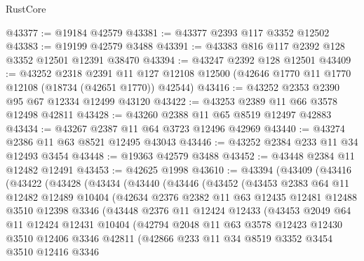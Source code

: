 \begin{lexlean}{RustCore}
\begin{coremodule}
@43377 := @19184 @42579
@43381 := @43377 @2393 @117 @3352 @12502
@43383 := @19199 @42579 @3488
@43391 := @43383 @816 @117 @2392 @128 @3352 @12501 @12391 @38470
@43394 := @43247 @2392 @128 @12501
@43409 := @43252
    @2318
    @2391
    @11
    @127
    @12108
    @12500
    (@42646 @1770 @11 @1770 @12108 (@18734 (@42651 @1770)) @42544)
@43416 := @43252 @2353 @2390 @95 @67 @12334 @12499 @43120
@43422 := @43253 @2389 @11 @66 @3578 @12498 @42811
@43428 := @43260 @2388 @11 @65 @8519 @12497 @42883
@43434 := @43267 @2387 @11 @64 @3723 @12496 @42969
@43440 := @43274 @2386 @11 @63 @8521 @12495 @43043
@43446 := @43252 @2384 @233 @11 @34 @12493 @3454
@43448 := @19363 @42579 @3488
@43452 := @43448 @2384 @11 @12482 @12491
@43453 := @42625 @1998
@43610 := @43394
    (@43409
      (@43416
        (@43422
          (@43428
            (@43434
              (@43440
                (@43446
                  (@43452
                    (@43453
                      @2383
                      @64
                      @11
                      @12482
                      @12489
                      @10404
                      (@42634
                        @2376
                        @2382
                        @11
                        @63
                        @12435
                        @12481
                        @12488
                        @3510
                        @12398
                        @3346
                        (@43448
                          @2376
                          @11
                          @12424
                          @12433
                          (@43453
                            @2049
                            @64
                            @11
                            @12424
                            @12431
                            @10404
                            (@42794
                              @2048
                              @11
                              @63
                              @3578
                              @12423
                              @12430
                              @3510
                              @12406
                              @3346
                              @42811
                              (@42866
                                @233
                                @11
                                @34
                                @8519
                                @3352
                                @3454
                                @3510
                                @12416
                                @3346

\end{coremodule}
\end{lexlean}
